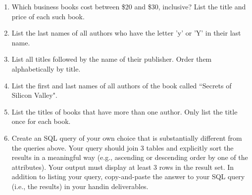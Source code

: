 \documentclass{article}
\begin{document}
\begin{enumerate}
\item Which business books cost between \$20 and \$30, inclusive? List the title and price of each such book.\\

\item List the last names of all authors who have the letter 'y' or 'Y' in their last name.\\

\item List all titles followed by the name of their publisher. Order them alphabetically by title.\\

\item List the first and last names of all authors of the book called ``Secrets of Silicon Valley". \\

\item List the titles of books that have more than one author. Only list the title once for each book. \\

\item Create an SQL query of your own choice that is substantially different from the queries above. Your query should join 3 tables and explicitly sort the results in a meaningful way (e.g., ascending or descending order by one of the attributes). Your output must display at least 3 rows in the result set. In addition to listing your query, copy-and-paste the answer to your SQL query (i.e., the results) in your handin deliverables.

	
\end{enumerate}
\end{document}
